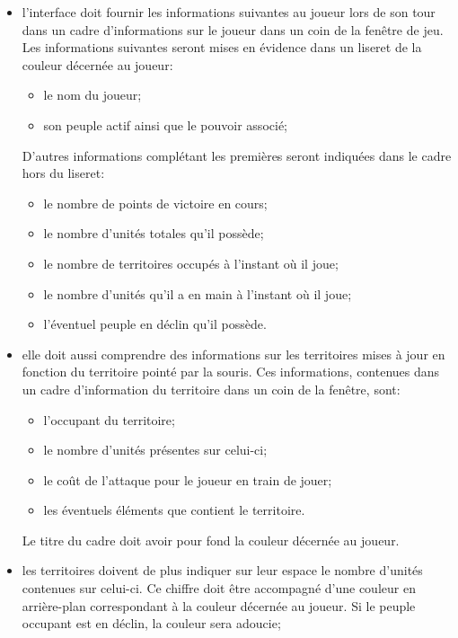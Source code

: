 \documentclass[a4paper, 11pt]{article}
\begin{document}
			\begin{itemize}
				\item l'interface doit fournir les informations suivantes au joueur lors de son tour dans un cadre d'informations sur le joueur dans un coin de la fenêtre de jeu. Les informations suivantes seront mises en évidence dans un liseret de la couleur décernée au joueur:
				\begin{itemize}
					\item le nom du joueur;
					\item son peuple actif ainsi que le pouvoir associé;
				\end{itemize}
				D'autres informations complétant les premières seront indiquées dans le cadre hors du liseret:
				\begin{itemize}
					\item le nombre de points de victoire en cours;
					\item le nombre d'unités totales qu'il possède;
					\item le nombre de territoires occupés à l'instant où il joue;
					\item le nombre d'unités qu'il a en main à l'instant où il joue;
					\item l'éventuel peuple en déclin qu'il possède. \\
				\end{itemize}
				
				\item elle doit aussi comprendre des informations sur les territoires mises à jour en fonction du territoire pointé par la souris. Ces informations, contenues dans un cadre d'information du territoire dans un coin de la fenêtre, sont:
				\begin{itemize}
					\item l'occupant du territoire;
					\item le nombre d'unités présentes sur celui-ci;
					\item le coût de l'attaque pour le joueur en train de jouer;
					\item les éventuels éléments que contient le territoire.
				\end{itemize}
				Le titre du cadre doit avoir pour fond la couleur décernée au joueur.
				\item les territoires doivent de plus indiquer sur leur espace le nombre d'unités contenues sur celui-ci. Ce chiffre doit être accompagné d'une couleur en arrière-plan correspondant à la couleur décernée au joueur. Si le peuple occupant est en déclin, la couleur sera adoucie; \\
				

\end{itemize}
\end{document}
